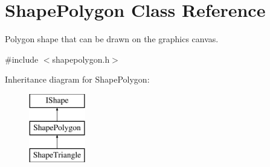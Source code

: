 \hypertarget{class_shape_polygon}{}\section{Shape\+Polygon Class Reference}
\label{class_shape_polygon}


Polygon shape that can be drawn on the graphics canvas.  




{\ttfamily \#include $<$shapepolygon.\+h$>$}

Inheritance diagram for Shape\+Polygon\+:\begin{figure}[H]
\begin{center}
\leavevmode
\includegraphics[height=3.000000cm]{class_shape_polygon}
\end{center}
\end{figure}
